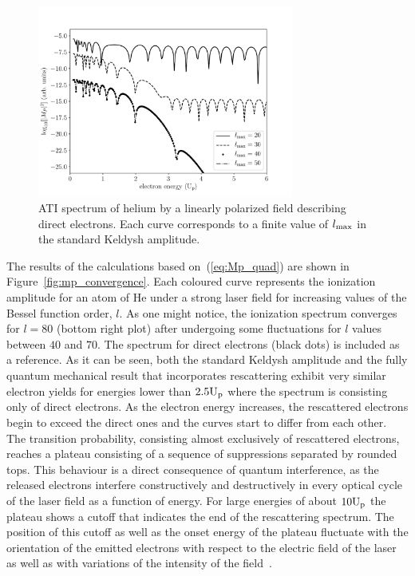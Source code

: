 \begin{figure}
  \centering
  \includegraphics[width=0.75\textwidth]{figures/ch_ATI_SFA/He/l20304050Keldysh.pdf}
\caption{ATI spectrum of helium by a linearly polarized field
  describing direct electrons. Each curve corresponds to a finite
  value of $l_{\rm{max}}$ in the standard Keldysh amplitude.}
\label{fig:keldysh_convergence}
\end{figure}

The results of the calculations based on~(\ref{eq:Mp_quad}) are shown
in Figure~\ref{fig:mp_convergence}. Each coloured curve represents the
ionization amplitude for an atom of He under a strong laser field for
increasing values of the Bessel function order, $l$. As one might
notice, the ionization spectrum converges for $l=80$ (bottom right
plot) after undergoing some fluctuations for $l$ values between $40$
and $70$. The spectrum for direct electrons (black dots) is included
as a reference. As it can be seen, both the standard Keldysh amplitude
and the fully quantum mechanical result that incorporates rescattering
exhibit very similar electron yields for energies lower than
$2.5\rm{U_{p}}$ where the spectrum is consisting only of direct
electrons. As the electron energy increases, the rescattered electrons
begin to exceed the direct ones and the curves start to differ from
each other. The transition probability, consisting almost exclusively
of rescattered electrons, reaches a plateau consisting of a sequence
of suppressions separated by rounded tops. This behaviour is a direct
consequence of quantum interference, as the released electrons
interfere constructively and destructively in every optical cycle of
the laser field as a function of energy. For large energies of about
$10\rm{U_{p}}$ the plateau shows a cutoff that indicates the end of
the rescattering spectrum. The position of this cutoff as well as the
onset energy of the plateau fluctuate with the orientation of the
emitted electrons with respect to the electric field of the laser as
well as with variations of the intensity of the
field~\cite{Kopold_1997sfa,Paulus_1994plateau,Paulus_1994plateau_classical}.


